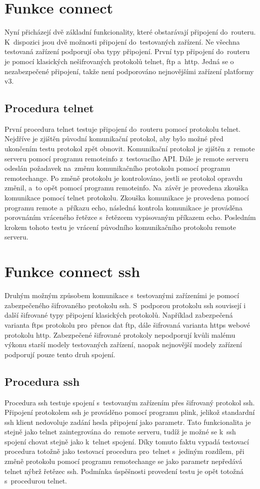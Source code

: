 \section{Funkce connect}
Nyní přicházejí dvě základní funkcionality, které obstarávají připojení do~routeru. K~dispozici jsou dvě možnosti připojení do~testovaných zařízení. Ne všechna testovaná zařízení podporují oba typy připojení. První typ připojení do~routeru je pomocí klasických nešifrovaných protokolů telnet, ftp a~http. Jedná se o nezabezpečené připojení, takže není podporováno nejnovějšími zařízení platformy v3.

\subsection{Procedura telnet}
První procedura telnet testuje připojení do~routeru pomocí protokolu telnet. Nejdříve je zjištěn původní komunikační protokol, aby bylo možné před ukončením testu protokol zpět obnovit. Komunikační protokol je zjištěn z~remote serveru pomocí programu remoteinfo z~testovacího API. Dále je remote serveru odeslán požadavek na~změnu komunikačního protokolu pomocí programu remotechange. Po změně protokolu je kontrolováno, jestli se protokol opravdu změnil, a~to opět pomocí programu remoteinfo. Na~závěr je provedena zkouška komunikace pomocí telnet protokolu. Zkouška komunikace je provedena pomocí programu remote a~příkazu echo, následná kontrola komunikace je prováděna porovnáním vráceného řetězce s~řetězcem vypisovaným příkazem echo. Posledním krokem tohoto testu je vrácení původního komunikačního protokolu remote serveru.

\section{Funkce connect ssh}
Druhým možným způsobem komunikace s~testovanými zařízeními je pomocí zabezpečeného šifrovaného protokolu ssh. S~podporou protokolu ssh souvisejí i další šifrované typy připojení klasických protokolů. Například zabezpečená varianta ftps protokolu pro~přenos dat ftp, dále šifrovaná varianta https webové protokolu http. Zabezpečené šifrované protokoly nepodporují kvůli malému výkonu starší modely testovaných zařízení, naopak nejnovější modely zařízení podporují pouze tento druh spojení.

\subsection{Procedura ssh}
Procedura ssh testuje spojení s~testovaným zařízením přes šifrovaný protokol ssh. Připojení protokolem ssh je prováděno pomocí programu plink, jelikož standardní ssh klient nedovoluje zadání hesla připojení jako parametr. Tato funkcionalita je stejně jako telnet zaintegrována do~remote serveru, tudíž je možné se k~ssh spojení chovat stejně jako k~telnet spojení. Díky tomuto faktu vypadá testovací procedura totožně jako testovací procedura pro~telnet s~jediným rozdílem, při změně protokolu pomocí programu remotechange se jako parametr nepředává telnet nýbrž řetězec ssh. Podmínka úspěšnosti provedení testu je opět totožná s~procedurou telnet.

